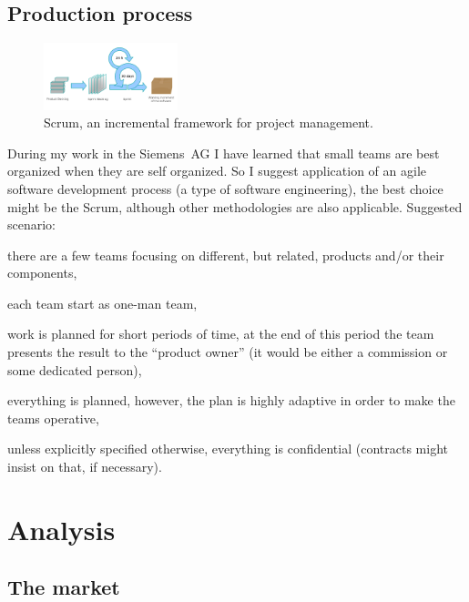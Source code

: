 \documentclass[a4paper,twoside,15pt]{book}
\begin{document}
	\section{Production process}
		\begin{figure}
			\centering{}
			\includegraphics[width=110pt]{images/Scrum_process.png}
			\caption{Scrum, an incremental framework for project management.}
		\end{figure}
		During my work in the Siemens~AG I have learned that small teams are best organized when they are self organized. So I suggest application of an agile software development process (a type of software engineering), the best choice might be the Scrum, although other methodologies are also applicable.
		Suggested scenario:
		\begin{dinglist}{73}
			\item there are a few teams focusing on different, but related, products and/or their components,
			\item each team start as one-man team,
			\item work is planned for short periods of time, at the end of this period the team presents the result to the ``product owner'' (it would be either a commission or some dedicated person),
			\item everything is planned, however, the plan is highly adaptive in order to make the teams operative,
			\item unless explicitly specified otherwise, everything is confidential (contracts might insist on that, if necessary).
		\end{dinglist}

\chapter{Analysis}
	\section{The market}
\end{document}

